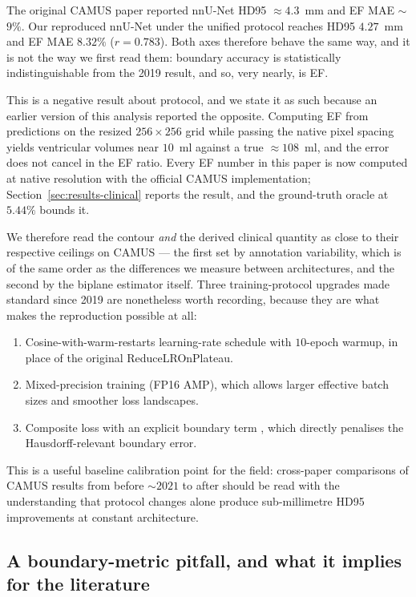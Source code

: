 The original CAMUS paper \citep{leclerc2019} reported nnU-Net HD95
$\approx 4.3$~mm and EF MAE $\sim$$9\%$. Our reproduced nnU-Net under the
unified protocol reaches HD95 $4.27$~mm and EF MAE $8.32\%$
($r = 0.783$).
Both axes
therefore behave the same way, and it is not the way we first read them:
boundary accuracy is statistically indistinguishable from the 2019 result,
and so, very nearly, is EF.

This is a negative result about protocol, and we state it as such because
an earlier version of this analysis reported the opposite. Computing EF from
predictions on the resized $256 \times 256$ grid while passing the native
pixel spacing yields ventricular volumes near $10$~ml against a true
$\approx 108$~ml, and the error does not cancel in the EF ratio. Every EF
number in this paper is now computed at native resolution with the official
CAMUS implementation; Section~\ref{sec:results-clinical} reports the result, and the
ground-truth oracle at $5.44\%$ bounds it.

We therefore read the contour \emph{and} the derived clinical quantity as
close to their respective ceilings on CAMUS --- the first set by annotation
variability, which is of the same order as the differences we measure between
architectures, and the second by the biplane estimator itself. Three
training-protocol upgrades made standard since 2019 are nonetheless worth
recording, because they are what makes the reproduction possible at all:
\begin{enumerate}[leftmargin=*,nosep]
\item Cosine-with-warm-restarts learning-rate schedule with
      $10$-epoch warmup, in place of the original ReduceLROnPlateau.
\item Mixed-precision training (FP16 AMP), which allows larger effective
      batch sizes and smoother loss landscapes.
\item Composite loss with an explicit boundary term
      \citep{kervadec2019}, which directly penalises the
      Hausdorff-relevant boundary error.
\end{enumerate}
This is a useful baseline calibration point for the field: cross-paper
comparisons of CAMUS results from before $\sim 2021$ to after should be
read with the understanding that protocol changes alone produce
sub-millimetre HD95 improvements at constant architecture.

\subsection{A boundary-metric pitfall, and what it implies for the
literature}
\label{sec:disc-pitfall}


